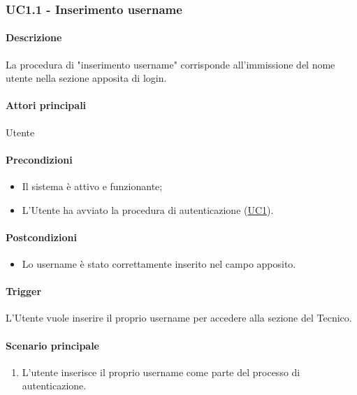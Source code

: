 \subsubsection{UC1.1 - Inserimento username}\label{UC1point1}

\paragraph*{Descrizione}
La procedura di "inserimento username" corrisponde all'immissione del nome utente nella sezione apposita di login.

\paragraph*{Attori principali}
Utente

\paragraph*{Precondizioni}
\begin{itemize}
  \item Il sistema è attivo e funzionante;
  \item L'Utente ha avviato la procedura di autenticazione (\hyperref[UC1]{UC1}).  
\end{itemize}

\paragraph*{Postcondizioni}
\begin{itemize}
  \item Lo username è stato correttamente inserito nel campo apposito.
\end{itemize}

\paragraph*{Trigger}
L'Utente vuole inserire il proprio username per accedere alla sezione del Tecnico.

\paragraph*{Scenario principale}
\begin{enumerate}
  \item L'utente inserisce il proprio username come parte del processo di autenticazione.
\end{enumerate}

